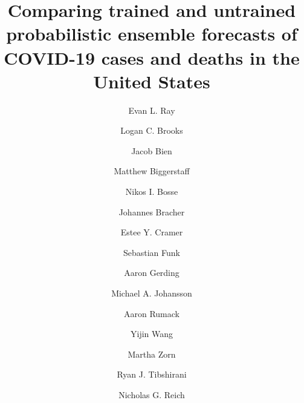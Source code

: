 \documentclass[11pt,3p,authoryear]{elsarticle}
\begin{document}
\begin{frontmatter}

\title{Comparing trained and untrained probabilistic ensemble forecasts of COVID-19 cases and deaths in the United States}

\author[umass]{Evan L. Ray}

\author[cmu]{Logan C. Brooks}

\author[usc]{Jacob Bien}

\author[cdc]{Matthew Biggerstaff}

\author[lshtm]{Nikos I. Bosse}

\author[kit,hits]{Johannes Bracher}

\author[umass]{Estee Y. Cramer}

\author[lshtm]{Sebastian Funk}

\author[umass]{Aaron Gerding}

\author[cdc]{Michael A. Johansson}

\author[cmu]{Aaron Rumack}

\author[umass]{Yijin Wang}

\author[umass]{Martha Zorn}

\author[cmu]{Ryan J. Tibshirani}

\author[umass]{Nicholas G. Reich}

\address[umass]{School of Public Health and Health Sciences, University of Massachusetts Amherst}
\address[cmu]{Machine Learning Department, Carnegie Mellon University}
\address[usc]{Department of Data Sciences and Operations, University of Southern California}
\address[cdc]{COVID-19 Response, U.S. Centers for Disease Control and Prevention}
\address[lshtm]{London School of Hygiene \& Tropical Medicine}
\address[kit]{Chair of Statistical Methods and Econometrics, Karlsruhe Institute of Technology}
\address[hits]{Computational Statistics Group, Heidelberg Institute for Theoretical Studies}




\end{frontmatter}
\end{document}
